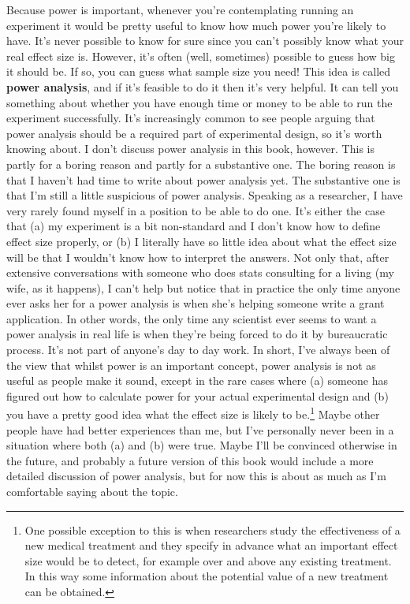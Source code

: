 \documentclass[
  a4paper,
]{book}
\begin{document}
Because power is important, whenever you're contemplating running an
experiment it would be pretty useful to know how much power you're
likely to have. It's never possible to know for sure since you can't
possibly know what your real effect size is. However, it's often (well,
sometimes) possible to guess how big it should be. If so, you can guess
what sample size you need! This idea is called \textbf{power analysis},
and if it's feasible to do it then it's very helpful. It can tell you
something about whether you have enough time or money to be able to run
the experiment successfully. It's increasingly common to see people
arguing that power analysis should be a required part of experimental
design, so it's worth knowing about. I don't discuss power analysis in
this book, however. This is partly for a boring reason and partly for a
substantive one. The boring reason is that I haven't had time to write
about power analysis yet. The substantive one is that I'm still a little
suspicious of power analysis. Speaking as a researcher, I have very
rarely found myself in a position to be able to do one. It's either the
case that (a) my experiment is a bit non-standard and I don't know how
to define effect size properly, or (b) I literally have so little idea
about what the effect size will be that I wouldn't know how to interpret
the answers. Not only that, after extensive conversations with someone
who does stats consulting for a living (my wife, as it happens), I can't
help but notice that in practice the only time anyone ever asks her for
a power analysis is when she's helping someone write a grant
application. In other words, the only time any scientist ever seems to
want a power analysis in real life is when they're being forced to do it
by bureaucratic process. It's not part of anyone's day to day work. In
short, I've always been of the view that whilst power is an important
concept, power analysis is not as useful as people make it sound, except
in the rare cases where (a) someone has figured out how to calculate
power for your actual experimental design and (b) you have a pretty good
idea what the effect size is likely to be.\footnote{One possible
  exception to this is when researchers study the effectiveness of a new
  medical treatment and they specify in advance what an important effect
  size would be to detect, for example over and above any existing
  treatment. In this way some information about the potential value of a
  new treatment can be obtained.} Maybe other people have had better
experiences than me, but I've personally never been in a situation where
both (a) and (b) were true. Maybe I'll be convinced otherwise in the
future, and probably a future version of this book would include a more
detailed discussion of power analysis, but for now this is about as much
as I'm comfortable saying about the topic.
\end{document}
